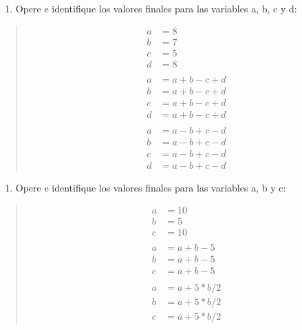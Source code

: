 \documentclass[letterpaper,10pt,spanish]{sphinxmanual}
\begin{document}
\begin{enumerate}
%
\setcounter{enumi}{6}
\item {} 
\sphinxAtStartPar
Opere e identifique los valores finales para las variables a, b, c y d:

\end{enumerate}
\begin{quote}
\begin{equation*}
\begin{split}a &= 8
\\ b &= 7
\\ c &= 5
\\ d &= 8
\\
\\ a &= a + b - c + d
\\ b &= a + b - c + d
\\ c &= a + b - c + d
\\ d &= a + b - c + d
\\
\\ a &= a - b + c - d
\\ b &= a - b + c - d
\\ c &= a - b + c - d
\\ d &= a - b + c - d\end{split}
\end{equation*}\end{quote}
\begin{enumerate}
%
\setcounter{enumi}{7}
\item {} 
\sphinxAtStartPar
Opere e identifique los valores finales para las variables a, b y c:

\end{enumerate}
\begin{quote}
\begin{equation*}
\begin{split}a &= 10
\\ b &= 5
\\ c &= 10
\\
\\ a &= a + b - 5
\\ b &= a + b - 5
\\ c &= a + b - 5
\\
\\ a &= a + 5 * b / 2
\\ b &= a + 5 * b / 2
\\ c &= a + 5 * b / 2\end{split}
\end{equation*}\end{quote}
\end{document}
